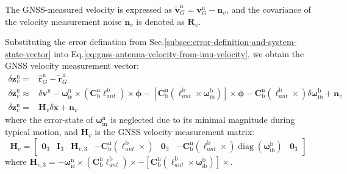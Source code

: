 \documentclass{article}
\begin{document}
The GNSS-measured velocity is expressed as $\tilde{\boldsymbol{v}}_{G}^{\mathrm{n}} = \boldsymbol{v}_{G}^{\mathrm{n}} - \boldsymbol{n}_{v}$, and the covariance of the velocity measurement noise $\boldsymbol{n}_{v}$ is denoted as $\boldsymbol{R}_{v}$.

Substituting the error defination from Sec.\ref{subsec:error-definition-and-system-state-vector} into Eq.\eqref{eq:gnss-antenna-velocity-from-imu-velocity}, we obtain the GNSS velocity measurement vector:
\begin{equation}
    \begin{aligned}
    \delta \boldsymbol{z}_{v}^{\mathrm{n}} =& \hat{\boldsymbol{r}}_{G}^{\mathrm{n}} - \tilde{\boldsymbol{r}}_{G}^{\mathrm{n}} \\
    \delta \boldsymbol{z}_{v}^{\mathrm{n}} \approx& \delta \boldsymbol{v}^{\mathrm{n}} - \boldsymbol{\omega}_{\mathrm{ie}}^{\mathrm{n}}\times \left(\mathbf{C}_{\mathrm{b}}^{\mathrm{n}} \boldsymbol{\ell}_{ant}^{\mathrm{b}}\right)\times \boldsymbol{\phi} - \left[\mathbf{C}_{\mathrm{b}}^{\mathrm{n}} \left(\boldsymbol{\ell}_{ant}^{\mathrm{b}} \times \boldsymbol{\omega}_{\mathrm{ib}}^{\mathrm{b}}\right)\right]\times \boldsymbol{\phi} - \mathbf{C}_{\mathrm{b}}^{\mathrm{n}} \left(\boldsymbol{\ell}_{ant}^{\mathrm{b}} \times \right) \delta \boldsymbol{\omega}_{\mathrm{ib}}^{\mathrm{b}} + \boldsymbol{n}_{v} \\
    \delta \boldsymbol{z}_{v}^{\mathrm{n}} =& \boldsymbol{H}_{v} \delta \boldsymbol{x} + \boldsymbol{n}_{v}
    \end{aligned}
\end{equation}
where the error-state of $\boldsymbol{\omega}_{\mathrm{in}}^{\mathrm{n}}$ is neglected due to its minimal magnitude during typical motion, and $\boldsymbol{H}_{v}$ is the GNSS velocity measurement matrix:
\begin{equation}
    \boldsymbol{H}_{v} = \begin{bmatrix}
        \boldsymbol{0}_3 & \boldsymbol{I}_3 & \boldsymbol{H}_{v,3} & -\mathbf{C}_{\mathrm{b}}^{\mathrm{n}} \left(\boldsymbol{\ell}_{ant}^{\mathrm{b}} \times \right) & \boldsymbol{0}_3 & -\mathbf{C}_{\mathrm{b}}^{\mathrm{n}} \left(\boldsymbol{\ell}_{ant}^{\mathrm{b}} \times \right) \operatorname{diag}(\boldsymbol{\omega}_{\mathrm{ib}}^{\mathrm{b}}) & \boldsymbol{0}_3
    \end{bmatrix}
\end{equation}
where $\boldsymbol{H}_{v,3} = - \boldsymbol{\omega}_{\mathrm{ie}}^{\mathrm{n}}\times \left(\mathbf{C}_{\mathrm{b}}^{\mathrm{n}} \boldsymbol{\ell}_{ant}^{\mathrm{b}}\right)\times  - \left[\mathbf{C}_{\mathrm{b}}^{\mathrm{n}} \left(\boldsymbol{\ell}_{ant}^{\mathrm{b}} \times \boldsymbol{\omega}_{\mathrm{ib}}^{\mathrm{b}}\right)\right]\times $.
\end{document}
